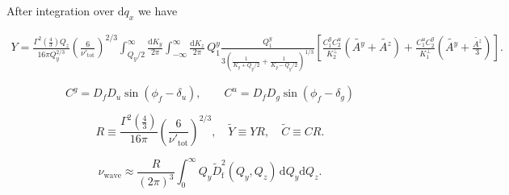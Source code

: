 \documentclass[a4paper,11pt]{article}
\begin{document}
After integration over $\mathrm{d}q_x$ we have

\begin{eqnarray}
  Y = \frac{\Gamma^2(\frac43)Q_z}{16\pi Q_y^{2/3}}\left(\frac6{\nu'_\mathrm{tot}}\right)^{2/3} \int_{Q_y/2}^\infty \frac{\mathrm{d}K_y}{2\pi} \int_{-\infty}^\infty \frac{\mathrm{d}K_z}{2\pi} \, Q_1^y 
 \frac{Q_1^y}{3\left( \frac1{K_y + Q_y/2} + \frac1{K_y - Q_y/2} \right)^{1/3}} 
 \left[\frac{C_1^g C_2^u}{K_2^\perp}(\tilde{A^y} + \tilde{A^z}) + \frac{C_1^u C_2^g}{K_1^\perp}(\tilde{A^y} + \frac{\tilde{A^z}}3 ) \right] .\nonumber
\end{eqnarray}

\begin{equation}
 C^g = D_f D_u \sin(\phi_f - \delta_u),\qquad C^u = D_f D_g \sin(\phi_f - \delta_g)
\end{equation}

$$ R \equiv \frac{\Gamma^2(\frac43)}{16\pi}\left(\frac6{\nu'_\mathrm{tot}}\right)^{2/3},\quad  \tilde{Y} \equiv YR,\quad \tilde{C} \equiv CR. $$

\begin{equation}
\nu_\mathrm{wave}  \approx\frac{R}{(2\pi)^3}\int_0^\infty Q_y \tilde{D}_\mathrm{f}^2(Q_y,Q_z)\,\mathrm{d}Q_y\mathrm{d}Q_z .
\end{equation}
\end{document}
